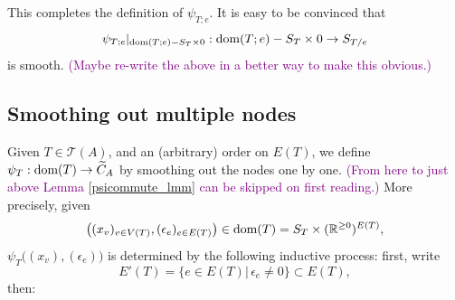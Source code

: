\documentclass[11pt]{article}
\theoremstyle{definition}
\theoremstyle{remark}
\def\wt#1{\widetilde{#1}}
\def\R{\mathbb{R}}
\def\cT{\mathcal{T}}
\def\cmt#1{\textcolor{purple}{(#1)}}
\def\tn#1{\textnormal{#1}}
\begin{document}
This completes the definition of $\psi_{T;e}$. 
It is easy to be convinced that  $$\psi_{T;e}|_{\tn{dom}(T;e)-S_T\times0}:\tn{dom}(T;e)-S_T\times0\to S_{T/e}$$
is smooth. 
\cmt{Maybe re-write the above in a better way to make this obvious.}


\subsection{Smoothing out multiple nodes}

Given $T\in\cT(A)$, and an (arbitrary) order on $E(T)$, 
we define $\psi_T:\tn{dom}(T)\to\wt{C}_A$  by smoothing out the nodes one by one. 
\cmt{From here to just above Lemma \ref{psicommute_lmm} can be skipped on first reading.}
More precisely, given $$\big((x_v)_{v\in V(T)},(\epsilon_{e})_{e\in E(T)}\big)\in\tn{dom}(T)=S_T\times(\R^{\ge0})^{E(T)},$$ 
$\psi_T\big((x_v),(\epsilon_{e})\big)$ is determined by the following inductive process: 
first, write 
$$E'(T)=\{e\in E(T)\big|\,\epsilon_e\neq0\}\subset E(T),$$
then: 
\end{document}
